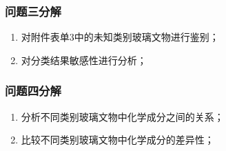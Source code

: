 \subsubsection{问题三分解}
\begin{enumerate}
	\item 对附件表单3中的未知类别玻璃文物进行鉴别；
	\item 对分类结果敏感性进行分析；
\end{enumerate}

\subsubsection{问题四分解}
\begin{enumerate}
	\item 分析不同类别玻璃文物中化学成分之间的关系；
	\item 比较不同类别玻璃文物中化学成分的差异性；
\end{enumerate}
